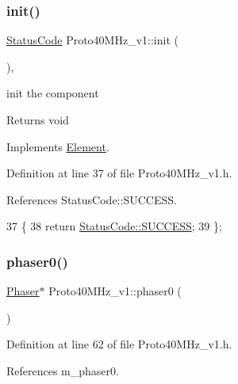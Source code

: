 \subsubsection{\texorpdfstring{init()}{init()}}
{\footnotesize\ttfamily \hyperlink{classStatusCode}{Status\+Code} Proto40\+M\+Hz\+\_\+v1\+::init (\begin{DoxyParamCaption}{ }\end{DoxyParamCaption})\hspace{0.3cm}{\ttfamily [inline]}, {\ttfamily [virtual]}}

init the component

\begin{DoxyReturn}{Returns}
void 
\end{DoxyReturn}


Implements \hyperlink{classElement_af42754b5cabc198869222725218d695c}{Element}.



Definition at line 37 of file Proto40\+M\+Hz\+\_\+v1.\+h.



References Status\+Code\+::\+S\+U\+C\+C\+E\+SS.


\begin{DoxyCode}
37                     \{
38     \textcolor{keywordflow}{return} \hyperlink{classStatusCode_a6f565cbeadc76d14c72f047e5e85eb4badd0da38d3ba0d922efd1f4619bc37ad8}{StatusCode::SUCCESS};
39   \};
\end{DoxyCode}
\mbox{\label{classProto40MHz__v1_a545f205296c492530a50febd54584f73}} 
\subsubsection{\texorpdfstring{phaser0()}{phaser0()}}
{\footnotesize\ttfamily \hyperlink{classPhaser}{Phaser}$\ast$ Proto40\+M\+Hz\+\_\+v1\+::phaser0 (\begin{DoxyParamCaption}{ }\end{DoxyParamCaption})\hspace{0.3cm}{\ttfamily [inline]}}



Definition at line 62 of file Proto40\+M\+Hz\+\_\+v1.\+h.



References m\+\_\+phaser0.



